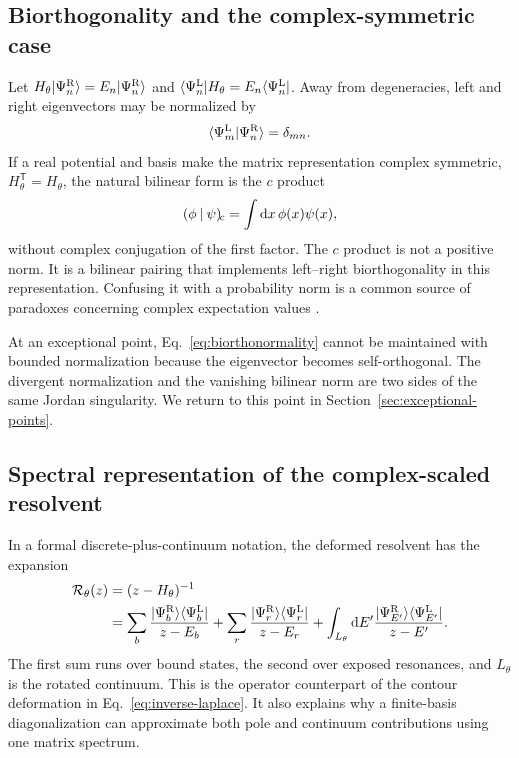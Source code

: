 \subsection{Biorthogonality and the complex-symmetric case}
\label{subsec:biorthogonality}

Let $H_\theta\lvert \Psi_n^{\mathrm R} \rangle=E_n\lvert \Psi_n^{\mathrm R} \rangle$ and
$\langle \Psi_n^{\mathrm L} \rvert H_\theta=E_n\langle \Psi_n^{\mathrm L} \rvert$.  Away from
degeneracies, left and right eigenvectors may be normalized by
\begin{equation}
  \langle \Psi_m^{\mathrm L}|\Psi_n^{\mathrm R} \rangle
  =\delta_{mn} .
  \label{eq:biorthonormality}
\end{equation}
If a real potential and basis make the matrix representation complex
symmetric, $H_\theta^{\mathsf T}=H_\theta$, the natural bilinear form is the
$c$ product
\begin{equation}
  (\phi\mathbin{|}\psi)_{\!c}
  =\int\mathrm{d} x\,\phi(x)\psi(x) ,
  \label{eq:c-product}
\end{equation}
without complex conjugation of the first factor.  The $c$ product is not a
positive norm.  It is a bilinear pairing that implements left--right
biorthogonality in this representation.  Confusing it with a probability norm
is a common source of paradoxes concerning complex expectation values
\cite{Berggren:1996,Moiseyev:2011}.

At an exceptional point, Eq.~\eqref{eq:biorthonormality} cannot be maintained
with bounded normalization because the eigenvector becomes self-orthogonal.
The divergent normalization and the vanishing bilinear norm are two sides of
the same Jordan singularity.  We return to this point in
Section~\ref{sec:exceptional-points}.

\subsection{Spectral representation of the complex-scaled resolvent}
\label{subsec:csm-resolvent}

In a formal discrete-plus-continuum notation, the deformed resolvent has the
expansion
\begin{align}
  \mathcal{R}_\theta(z)
  &=(z-H_\theta)^{-1}
  \notag\\
  &=\sum_{b}\frac{\lvert \Psi_b^{\mathrm R} \rangle
  \langle \Psi_b^{\mathrm L} \rvert}{z-E_b}
  +\sum_{r}\frac{\lvert \Psi_r^{\mathrm R} \rangle
  \langle \Psi_r^{\mathrm L} \rvert}{z-E_r}
  +
  \int_{L_\theta}\mathrm{d} E'
  \frac{\lvert \Psi_{E'}^{\mathrm R} \rangle
  \langle \Psi_{E'}^{\mathrm L} \rvert}{z-E'} .
  \label{eq:csm-resolvent-expansion}
\end{align}
The first sum runs over bound states, the second over exposed resonances, and
$L_\theta$ is the rotated continuum.  This is the operator counterpart of the
contour deformation in Eq.~\eqref{eq:inverse-laplace}.  It also explains why a
finite-basis diagonalization can approximate both pole and continuum
contributions using one matrix spectrum.
